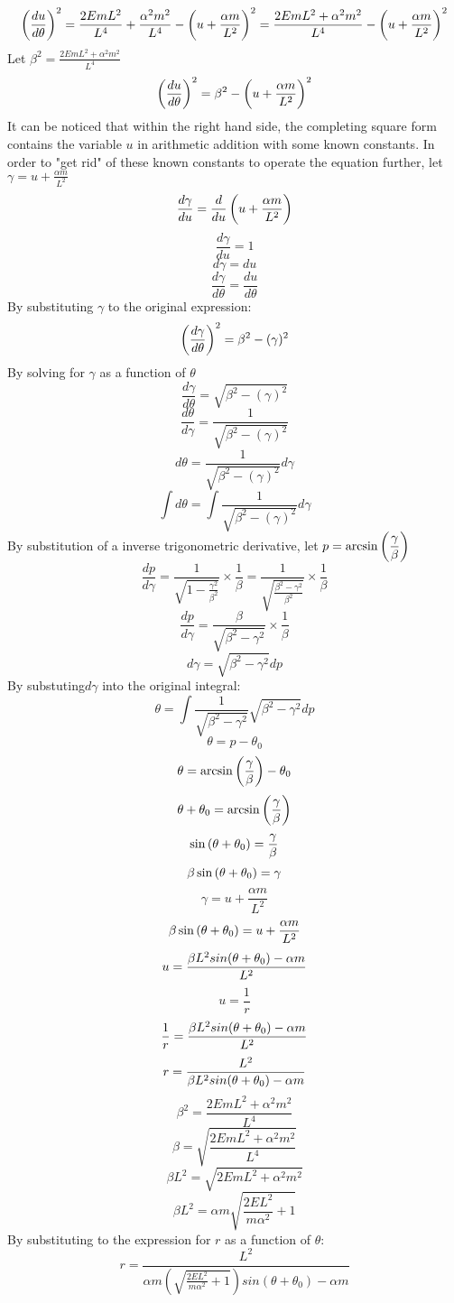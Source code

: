 \documentclass[class=report, 12pt, crop=false]{standalone}
\begin{document}
\begin{center}
$$\left(\frac{du}{d\theta}\right)^2=\frac{2EmL^2}{L^4}+ \frac{\alpha^2 m^2}{L^4}-\left(u+\frac{\alpha m}{L^2}\right)^2 = \frac{2EmL^2+\alpha^2 m^2}{L^4}-\left(u+\frac{\alpha m}{L^2}\right)^2$$
Let $\displaystyle \beta^2 = \frac{2EmL^2+\alpha^2 m^2}{L^4}$
$$\left(\frac{du}{d\theta}\right)^2=\beta^2-\left(u+\frac{\alpha m}{L^2}\right)^2$$
It can be noticed that within the right hand side, the completing square form contains the variable $u$ in arithmetic addition with some known constants. In order to "get rid" of these known constants to operate the equation further, let $\displaystyle \gamma = u +\frac{\alpha m}{L^2}$
$$\frac{d\gamma}{du} = \frac{d}{du}\left(u+\frac{\alpha m}{L^2}\right)$$
$$\frac{d\gamma}{du} = 1$$
$$d\gamma = du$$
$$\frac{d\gamma}{d\theta}=\frac{du}{d\theta}$$
By substituting $\gamma$ to the original expression:
$$\left(\frac{d\gamma}{d\theta}\right)^2 = \beta^2-(\gamma)^2$$
By solving for $\gamma$ as a function of $\theta$
$$\frac{d\gamma}{d\theta} = \sqrt{\beta^2-(\gamma)^2}$$
$$\frac{d\theta}{d\gamma} = \frac{1}{\sqrt{\beta^2-(\gamma)^2}}$$
$$d\theta= \frac{1}{\sqrt{\beta^2-(\gamma)^2}}d\gamma$$
$$\int{d\theta} = \int{\frac{1}{\sqrt{\beta^2-(\gamma)^2}}d\gamma}$$
By substitution of a inverse trigonometric derivative, let $\displaystyle p = \arcsin\left(\frac{\gamma}{\beta}\right)$
$$\frac{dp}{d\gamma} = \frac{1}{\sqrt{1-\frac{\gamma^2}{\beta^2}}}\times\frac{1}{\beta} = \frac{1}{\sqrt{\frac{\beta^2-\gamma^2}{\beta^2}}}\times\frac{1}\beta$$
$$\frac{dp}{d\gamma}=\frac{\beta}{\sqrt{\beta^2-\gamma^2}}\times\frac{1}{\beta}$$
$$d\gamma=\sqrt{\beta^2-\gamma^2}dp$$
By substuting$d\gamma$ into the original integral:
$$\theta = \int{\frac{1}{\sqrt{\beta^2-\gamma^2}}\sqrt{\beta^2-\gamma^2}dp}$$
$$\theta = p - \theta_0$$
$$\theta = \arcsin{\left(\frac{\gamma}{\beta}\right)}-\theta_0$$
$$\theta + \theta_0 = \arcsin{\left(\frac{\gamma}{\beta}\right)}$$
$$\sin{\left(\theta+\theta_0\right)} = \frac{\gamma}{\beta}$$
$$\beta\sin{\left(\theta+\theta_0\right)} =\gamma$$
$$\gamma = u + \frac{\alpha m}{L^2}$$
$$\beta\sin{\left(\theta+\theta_0\right)} =u + \frac{\alpha m}{L^2}$$
$$u = \frac{\beta L^2sin{\left(\theta+ \theta_0\right)}-\alpha m}{L^2}$$
$$u = \frac{1}{r}$$
$$\frac{1}{r}=\frac{\beta L^2sin{\left(\theta+ \theta_0\right)}-\alpha m}{L^2}$$
$$r = \frac{L^2}{\beta L^2sin{\left(\theta+ \theta_0\right)}-\alpha m}$$
$$\beta^2 = \frac{2EmL^2+\alpha^2 m^2}{L^4}$$
$$\beta = \sqrt{\frac{2EmL^2+\alpha^2 m^2}{L^4}}$$
$$\beta L^2 =\sqrt{2EmL^2+\alpha^2 m^2} $$
$$\beta L^2 =\alpha m\sqrt{\frac{2EL^2}{m\alpha^2}+1}$$
By substituting to the expression for $r$ as a function of $\theta$:
$$r = \frac{L^2}{\alpha m(\sqrt{\frac{2EL^2}{m\alpha^2}+1})sin{(\theta+ \theta_0)}-\alpha m}$$

\end{center}
\end{document}
